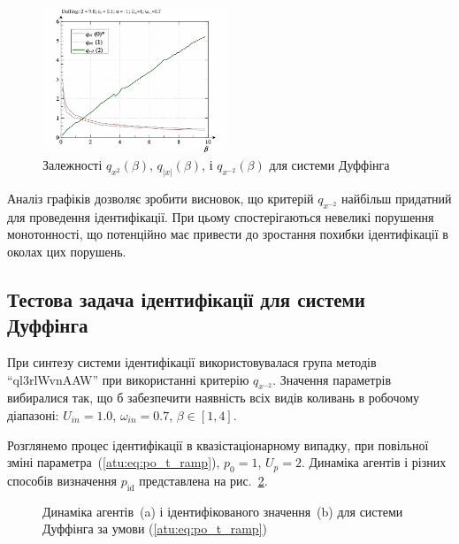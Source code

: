\begin{figure}[ht!]
\begin{center}
  \includegraphics[width=0.49\textwidth]{p/cha/duff/duff_q-p_q_1x00_0x70.png}
\end{center}
\caption{Залежності $ q_{x^2}(\beta)$, $ q_{|x|}(\beta)$, і $q_{x^{-2}}(\beta)$ для системи Дуффінга}
\label{atu:f:duff_q}
\end{figure}

Аналіз графіків дозволяє зробити висновок, що критерій
$q_{x^{-2}}$ найбільш придатний для проведення ідентифікації. При
цьому спостерігаються невеликі порушення монотонності, що
потенційно має привести до зростання похибки ідентифікації в
околах цих порушень.




\subsection{Тестова задача ідентифікації для системи Дуффінга} %

При синтезу системи ідентифікації використовувалася група
методів ``ql3rlWvnAAW'' при використанні критерію
$q_{x^{-2}}$. Значення параметрів вибиралися так, що б забезпечити
наявність всіх видів коливань в робочому діапазоні:
$U_{in} = 1.0 $,
$\omega_{in} = 0.7 $,
$\beta \in [1, 4] $.

Розглянемо процес ідентифікації в квазістаціонарному випадку,
при повільної зміні параметра~(\ref{atu:eq:po_t_ramp}),
$ p_0 = 1 $,
$ U_p = 2 $. Динаміка агентів і різних способів визначення
$ p_\mathrm{id} $ представлена на рис.~\ref{atu:f:duff_id_ramp}.

\begin{figure}[ht!]
  \caption{Динаміка агентів~(a) і ідентифікованого значення~(b) для системи Дуффінга за умови (\ref{atu:eq:po_t_ramp})}
\label{atu:f:duff_id_ramp}
\end{figure}

